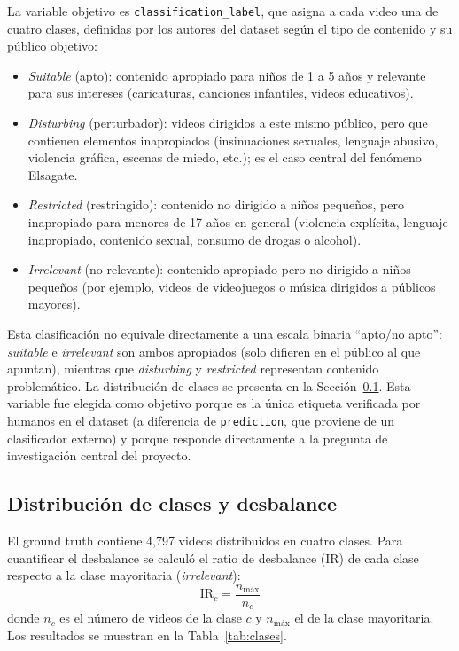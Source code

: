 \documentclass[conference]{IEEEtran}
\begin{document}
La variable objetivo es \texttt{classification\_label}, que asigna a cada video una de cuatro clases, definidas por los autores del dataset según el tipo de contenido y su público objetivo:
\begin{itemize}
\item \textit{Suitable} (apto): contenido apropiado para niños de 1 a 5 años y relevante para sus intereses (caricaturas, canciones infantiles, videos educativos).
\item \textit{Disturbing} (perturbador): videos dirigidos a este mismo público, pero que contienen elementos inapropiados (insinuaciones sexuales, lenguaje abusivo, violencia gráfica, escenas de miedo, etc.); es el caso central del fenómeno Elsagate.
\item \textit{Restricted} (restringido): contenido no dirigido a niños pequeños, pero inapropiado para menores de 17 años en general (violencia explícita, lenguaje inapropiado, contenido sexual, consumo de drogas o alcohol).
\item \textit{Irrelevant} (no relevante): contenido apropiado pero no dirigido a niños pequeños (por ejemplo, videos de videojuegos o música dirigidos a públicos mayores).
\end{itemize}
Esta clasificación no equivale directamente a una escala binaria ``apto/no apto'': \textit{suitable} e \textit{irrelevant} son ambos apropiados (solo difieren en el público al que apuntan), mientras que \textit{disturbing} y \textit{restricted} representan contenido problemático. La distribución de clases se presenta en la Sección~\ref{sec:clases}. Esta variable fue elegida como objetivo porque es la única etiqueta verificada por humanos en el dataset (a diferencia de \texttt{prediction}, que proviene de un clasificador externo) y porque responde directamente a la pregunta de investigación central del proyecto.

\subsection{Distribución de clases y desbalance}\label{sec:clases}
El ground truth contiene 4,797 videos distribuidos en cuatro clases. Para cuantificar el desbalance se calculó el ratio de desbalance (IR) de cada clase respecto a la clase mayoritaria (\textit{irrelevant}):
\begin{equation}
\mathrm{IR}_c=\frac{n_{\text{máx}}}{n_c}\label{eq:ir}
\end{equation}
donde $n_c$ es el número de videos de la clase $c$ y $n_{\text{máx}}$ el de la clase mayoritaria. Los resultados se muestran en la Tabla~\ref{tab:clases}.
\end{document}

